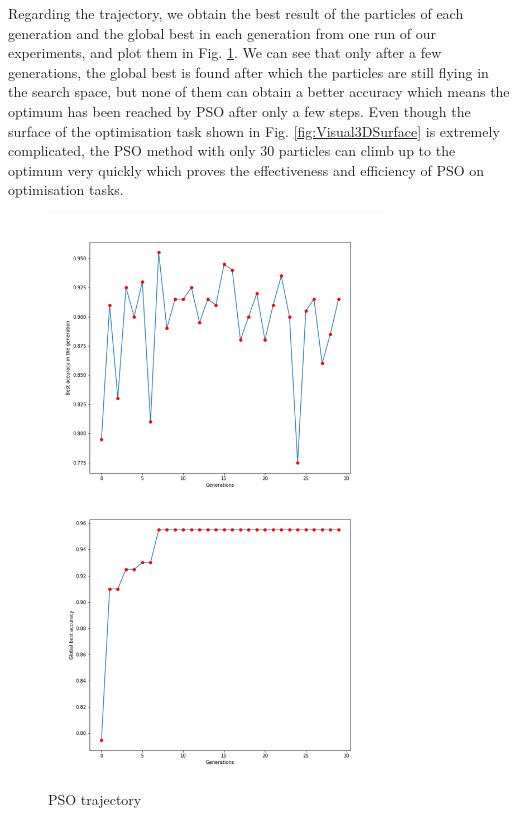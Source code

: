 \documentclass[conference]{IEEEtran}
\begin{document}
Regarding the trajectory, we obtain the best result of the particles of each generation and the global best in each generation from one run of our experiments, and plot them in Fig. \ref{fig:VisualTrajectory}. We can see that only after a few generations, the global best is found after which the particles are still flying in the search space, but none of them can obtain a better accuracy which means the optimum has been reached by PSO after only a few steps. Even though the surface of the optimisation task shown in Fig. \ref{fig:Visual3DSurface} is extremely complicated, the PSO method with only 30 particles can climb up to the optimum very quickly which proves the effectiveness and efficiency of PSO on optimisation tasks. 

\begin{figure}[!t]
	\centering
	\includegraphics[width=3.5in]{trajectory}
	\caption{PSO trajectory}
	\label{fig:VisualTrajectory}
\end{figure}
\end{document}
